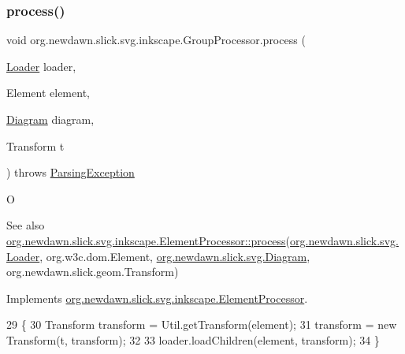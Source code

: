 \subsubsection{\texorpdfstring{process()}{process()}}
{\footnotesize\ttfamily void org.\+newdawn.\+slick.\+svg.\+inkscape.\+Group\+Processor.\+process (\begin{DoxyParamCaption}\item[{\mbox{\hyperlink{interfaceorg_1_1newdawn_1_1slick_1_1svg_1_1_loader}{Loader}}}]{loader,  }\item[{Element}]{element,  }\item[{\mbox{\hyperlink{classorg_1_1newdawn_1_1slick_1_1svg_1_1_diagram}{Diagram}}}]{diagram,  }\item[{Transform}]{t }\end{DoxyParamCaption}) throws \mbox{\hyperlink{classorg_1_1newdawn_1_1slick_1_1svg_1_1_parsing_exception}{Parsing\+Exception}}\hspace{0.3cm}{\ttfamily [inline]}}

O \begin{DoxySeeAlso}{See also}
\mbox{\hyperlink{interfaceorg_1_1newdawn_1_1slick_1_1svg_1_1inkscape_1_1_element_processor_acd170a9e1119481edae885780db59a2e}{org.\+newdawn.\+slick.\+svg.\+inkscape.\+Element\+Processor\+::process}}(\mbox{\hyperlink{interfaceorg_1_1newdawn_1_1slick_1_1svg_1_1_loader}{org.\+newdawn.\+slick.\+svg.\+Loader}}, org.\+w3c.\+dom.\+Element, \mbox{\hyperlink{classorg_1_1newdawn_1_1slick_1_1svg_1_1_diagram}{org.\+newdawn.\+slick.\+svg.\+Diagram}}, org.\+newdawn.\+slick.\+geom.\+Transform) 
\end{DoxySeeAlso}


Implements \mbox{\hyperlink{interfaceorg_1_1newdawn_1_1slick_1_1svg_1_1inkscape_1_1_element_processor_acd170a9e1119481edae885780db59a2e}{org.\+newdawn.\+slick.\+svg.\+inkscape.\+Element\+Processor}}.


\begin{DoxyCode}
29                                                                                                            
         \{
30         Transform transform = Util.getTransform(element);
31         transform = \textcolor{keyword}{new} Transform(t, transform);
32         
33         loader.loadChildren(element, transform);
34     \}
\end{DoxyCode}

